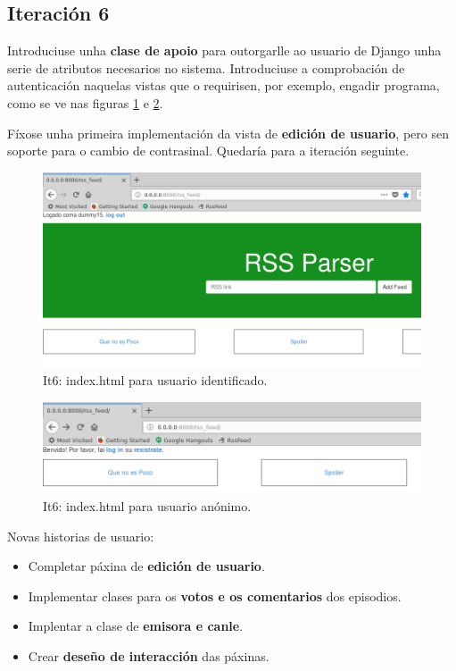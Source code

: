 \subsection{Iteración 6}

Introduciuse unha \textbf{clase de apoio} para outorgarlle ao usuario de Django unha serie de atributos necesarios no sistema. Introduciuse a comprobación de autenticación naquelas vistas que o requirisen, por exemplo, engadir programa, como se ve nas figuras \ref{fig:it6_log} e \ref{fig:it6_anon}.

Fíxose unha primeira implementación da vista de \textbf{edición de usuario}, pero sen soporte para o cambio de contrasinal. Quedaría para a iteración seguinte.

\begin{figure}[h]
	\centering
	\includegraphics[scale=0.4,keepaspectratio=true]{./images/it6_log.png}
	\caption{It6: index.html para usuario identificado.}
	\label{fig:it6_log}
\end{figure}

\begin{figure}[h]
	\centering
	\includegraphics[scale=0.5,keepaspectratio=true]{./images/it6_anon.png}
	\caption{It6: index.html para usuario anónimo.}
	\label{fig:it6_anon}
\end{figure}

Novas historias de usuario:
\begin{itemize}
	\item Completar páxina de \textbf{edición de usuario}.
	\item Implementar clases para os \textbf{votos e os comentarios} dos episodios.
	\item Implentar a clase de \textbf{emisora e canle}.
	\item Crear \textbf{deseño de interacción} das páxinas.
\end{itemize}

